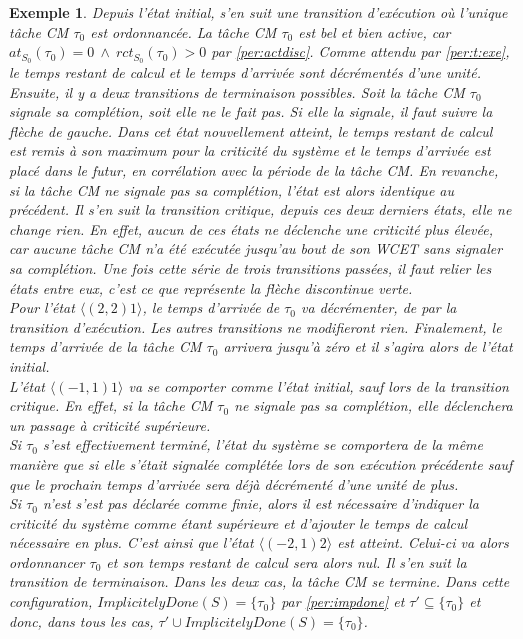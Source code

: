 \documentclass[12pt,a4paper,oneside]{book}
\theoremstyle{break}
\newtheorem{exem}{Exemple}[chapter]
\theoremstyle{breakplain}
\begin{document}
\begin{exem}
Depuis l'état initial, s'en suit une transition d'exécution où l'unique tâche CM $\tau_0$ est ordonnancée. La tâche CM $\tau_0$ est bel et bien active, car $at_{S_0}(\tau_0) = 0\ \wedge\ rct_{S_0}(\tau_0) > 0$ par \autoref{per:actdisc}. Comme attendu par \autoref{per:t:exe}, le temps restant de calcul et le temps d'arrivée sont décrémentés d'une unité. Ensuite, il y a deux transitions de terminaison possibles. Soit la tâche CM $\tau_0$ signale sa complétion, soit elle ne le fait pas. Si elle la signale, il faut suivre la flèche de gauche. Dans cet état nouvellement atteint, le temps restant de calcul est remis à son maximum pour la criticité du système et le temps d'arrivée est placé dans le futur, en corrélation avec la période de la tâche CM. En revanche, si la tâche CM ne signale pas sa complétion, l'état est alors identique au précédent. Il s'en suit la transition critique, depuis ces deux derniers états, elle ne change rien. En effet, aucun de ces états ne déclenche une criticité plus élevée, car aucune tâche CM n'a été exécutée jusqu'au bout de son WCET sans signaler sa complétion. Une fois cette série de trois transitions passées, il faut relier les états entre eux, c'est ce que représente la flèche discontinue verte.\\

Pour l'état $\langle (2, 2) 1\rangle$, le temps d'arrivée de $\tau_0$ va décrémenter, de par la transition d'exécution. Les autres transitions ne modifieront rien. Finalement, le temps d'arrivée de la tâche CM $\tau_0$ arrivera jusqu'à zéro et il s'agira alors de l'état initial.\\

L'état $\langle (-1, 1) 1 \rangle$ va se comporter comme l'état initial, sauf lors de la transition critique. En effet, si la tâche CM $\tau_0$ ne signale pas sa complétion, elle déclenchera un passage à criticité supérieure.\\

Si $\tau_0$ s'est effectivement terminé, l'état du système se comportera de la même manière que si elle s'était signalée complétée lors de son exécution précédente sauf que le prochain temps d'arrivée sera déjà décrémenté d'une unité de plus.\\

Si $\tau_0$ n'est s'est pas déclarée comme finie, alors il est nécessaire d'indiquer la criticité du système comme étant supérieure et d'ajouter le temps de calcul nécessaire en plus. C'est ainsi que l'état $\langle (-2, 1) 2 \rangle$ est atteint. Celui-ci va alors ordonnancer $\tau_0$ et son temps restant de calcul sera alors nul. Il s'en suit la transition de terminaison. Dans les deux cas, la tâche CM se termine. Dans cette configuration, $ImplicitelyDone(S) = \{\tau_0\}$ par \autoref{per:impdone} et $\tau' \subseteq \{\tau_0\}$ et donc, dans tous les cas, $\tau' \cup ImplicitelyDone(S) = \{\tau_0\}$.\\


\end{exem}
\end{document}
